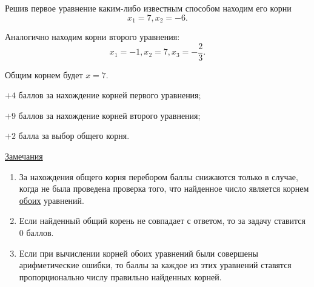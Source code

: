 \solutionSection

Решив первое уравнение каким-либо известным способом находим его корни	
$$x_1 = 7, x_2 = -6.$$
    
Аналогично находим корни второго уравнения: 
$$x_1 = -1, x_2 = 7, x_3 = -\frac{2}{3}.$$
    
Общим корнем будет $x = 7$.


\additionalCriteria

$+4$ баллов за нахождение корней первого уравнения;

$+9$ баллов за нахождение корней второго уравнения;

$+2$ балла за выбор общего корня.
	
\underline{Замечания} 

\begin{enumerate}
	\item За нахождения общего корня перебором баллы снижаются
	только в случае, когда не была проведена проверка того, что найденное
	число является корнем \underline{обоих} уравнений.

	\item Если найденный общий корень не совпадает с ответом,
	то за задачу ставится $0$ баллов.	
	 
	\item Если при вычислении корней обоих уравнений были совершены 
	арифметические ошибки, то баллы за каждое из этих уравнений ставятся
	пропорционально числу правильно найденных корней.
\end{enumerate}
